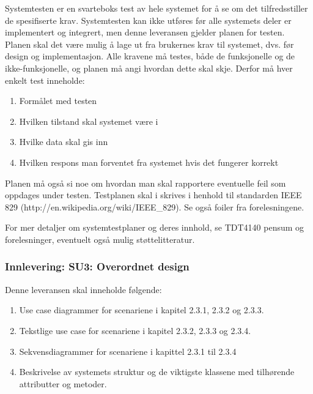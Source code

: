 Systemtesten er en svarteboks test av hele systemet for å se om det tilfredsstiller de spesifiserte krav. Systemtesten kan ikke utføres før alle systemets deler er implementert og integrert, men denne leveransen gjelder planen for testen. Planen skal det være mulig å lage ut fra brukernes krav til systemet, dvs. før design og implementasjon. Alle kravene må testes, både de funksjonelle og de ikke-funksjonelle, og planen må angi hvordan dette skal skje. Derfor må hver enkelt test inneholde:

\begin{enumerate}

\item
Formålet med testen

\item
Hvilken tilstand skal systemet være i

\item
Hvilke data skal gis inn

\item
Hvilken respons man forventet fra systemet hvis det fungerer korrekt

\end{enumerate}

Planen må også si noe om hvordan man skal rapportere eventuelle feil som oppdages under testen. Testplanen skal i skrives i henhold til standarden IEEE 829 (http://en.wikipedia.org/wiki/IEEE\_829). Se også foiler fra forelesningene.

For mer detaljer om systemtestplaner og deres innhold, se TDT4140 pensum og forelesninger, eventuelt også mulig støttelitteratur.

\subsubsection{Innlevering: SU3: Overordnet design}

Denne leveransen skal inneholde følgende:

\begin{enumerate}

\item
Use case diagrammer for scenariene i kapitel 2.3.1, 2.3.2 og 2.3.3.

\item
Tekstlige use case for scenariene i kapitel 2.3.2, 2.3.3 og 2.3.4.

\item
Sekvensdiagrammer for scenariene i kapittel 2.3.1 til 2.3.4

\item
Beskrivelse av systemets struktur og de viktigste klassene med tilhørende attributter og metoder.

\end{enumerate}

